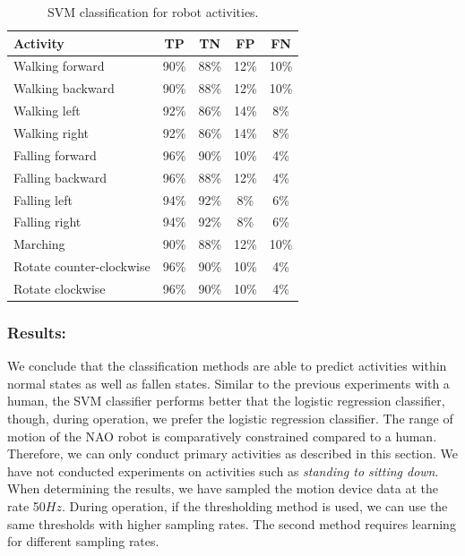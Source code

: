 \documentclass[letterpaper]{article}
\begin{document}
\begin{table}[!ht]
\caption{SVM classification for robot activities.}
	\label{tab:robot-svm-class}
	\centering
		\begin{tabular} {| l | c | c | c | c | }
		\hline
			{\bf Activity} & {\bf  TP}  &	{\bf TN}  &	{\bf FP} &	{\bf FN} \\ 
\hline
			Walking forward	& 90\%	& 88\%	& 12\%	& 10\% \\ \hline
			Walking backward	& 90\%	& 88\%	& 12\%	& 10\% \\ \hline
			Walking left	& 92\%	& 86\%	& 14\%	& 8\% \\ \hline
			Walking right	& 92\%	& 86\%	& 14\%	& 8\% \\ \hline
			Falling forward	& 96\%	& 90\%	& 10\%	& 4\%	 \\ \hline
			Falling backward	& 96\%	& 88\%	& 12\%	& 4\%	 \\ \hline
			Falling left	& 94\%	& 92\%	& 8\%	& 6\%	 \\ \hline
			Falling right	& 94\%	& 92\%	& 8\%	& 6\%	 \\ \hline
			Marching	& 90\%	& 88\%	& 12\%	& 10\%	 \\ \hline
			Rotate counter-clockwise	& 96\%	& 90\%	& 10\%	& 4\%	 \\ \hline
			Rotate clockwise	& 96\%	& 90\%	& 10\%	& 4\%	 \\ \hline
		\end{tabular}
\end{table}

\subsubsection{Results:} 
We conclude that the classification methods are able to predict activities within normal states 
as well as fallen states. Similar to the previous experiments with a human, the SVM classifier performs 
better that the logistic regression classifier, though, during operation, we prefer the logistic regression classifier. The range of motion of the NAO robot is comparatively constrained compared to a 
human. Therefore, we can only conduct primary activities as described in this section. We have not 
conducted experiments on activities such as \textit{standing to sitting down}. When determining the results, we 
have sampled the motion device data at the rate 50$Hz$. During operation, if the 
thresholding method is used, we can use the same thresholds with higher sampling rates. The second 
method requires learning for different sampling rates.
\end{document}
